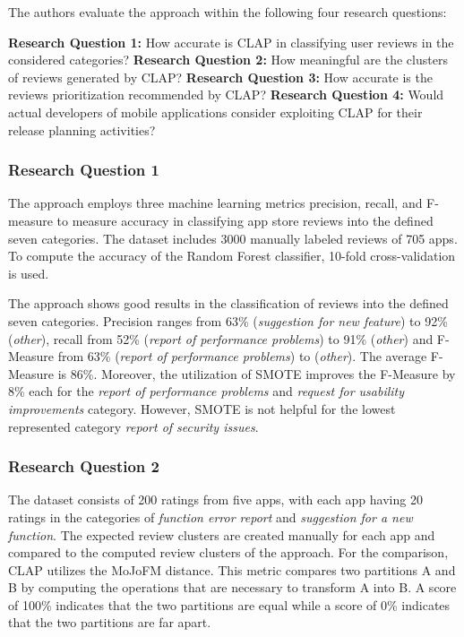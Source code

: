 The authors evaluate the approach within the following four research questions:

\textbf{Research Question 1:} How accurate is CLAP in classifying user reviews in the considered categories? \newline
\textbf{Research Question 2:} How meaningful are the clusters of reviews generated by CLAP? \newline
\textbf{Research Question 3:} How accurate is the reviews prioritization recommended by CLAP? \newline
\textbf{Research Question 4:} Would actual developers of mobile applications consider exploiting CLAP for their release planning activities? 

\subsubsection{Research Question 1}

The approach employs three machine learning metrics precision, recall, and F-measure to measure accuracy in classifying app store reviews into the defined seven categories. The dataset includes 3000 manually labeled reviews of 705 apps. To compute the accuracy of the Random Forest classifier, 10-fold cross-validation is used.

The approach shows good results in the classification of reviews into the defined seven categories. Precision ranges from 63\% (\textit{suggestion for new feature}) to 92\% (\textit{other}), recall from 52\% (\textit{report of performance problems}) to 91\% (\textit{other}) and F-Measure from 63\% (\textit{report of performance problems}) to (\textit{other}). The average F-Measure is 86\%. 
Moreover, the utilization of SMOTE improves the F-Measure by 8\% each for the \textit{report of performance problems} and \textit{request for usability improvements} category. However, SMOTE is not helpful for the lowest represented category \textit{report of security issues}.

\subsubsection{Research Question 2}

The dataset consists of 200 ratings from five apps, with each app having 20 ratings in the categories of \textit{function error report} and \textit{suggestion for a new function}. The expected review clusters are created manually for each app and compared to the computed review clusters of the approach. For the comparison, CLAP utilizes the MoJoFM distance. This metric compares two partitions A and B by computing the operations that are necessary to transform A into B. A score of 100\% indicates that the two partitions are equal while a score of 0\% indicates that the two partitions are far apart.

